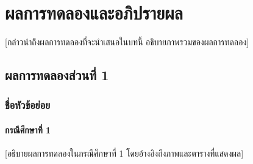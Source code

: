 
\chapter{ผลการทดลองและอภิปรายผล}

\noindent\hspace{\parindent}%
[กล่าวนำถึงผลการทดลองที่จะนำเสนอในบทนี้ อธิบายภาพรวมของผลการทดลอง]

\section{ผลการทดลองส่วนที่ 1}

\subsection{ชื่อหัวข้อย่อย}

\subsubsection{กรณีศึกษาที่ 1}

\noindent\hspace{\parindent}%
[อธิบายผลการทดลองในกรณีศึกษาที่ 1 โดยอ้างอิงถึงภาพและตารางที่แสดงผล]



